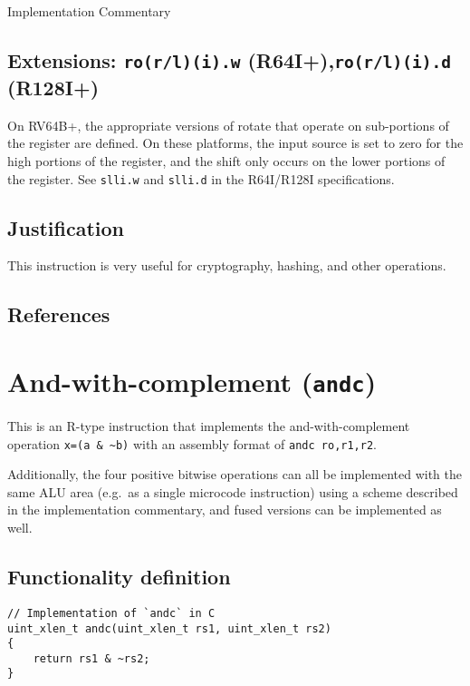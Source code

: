 Implementation Commentary

\subsection{Extensions: \texttt{ro(r/l)(i).w} (R64I+),\texttt{ro(r/l)(i).d} (R128I+)}

On RV64B+, the appropriate versions of rotate that operate on
sub-portions of the register are defined. On these platforms, the input
source is set to zero for the high portions of the register, and the
shift only occurs on the lower portions of the register. See
\texttt{slli.w} and \texttt{slli.d} in the R64I/R128I specifications.

\subsection{Justification}

This instruction is very useful for cryptography, hashing, and other
operations.

\subsection{References}


\section{And-with-complement (\texttt{andc})}



This is an R-type instruction that implements the and-with-complement
operation \texttt{x=(a\ \&\ \textasciitilde{}b)} with an assembly format
of \texttt{andc\ ro,r1,r2}.

Additionally, the four positive bitwise operations can all be
implemented with the same ALU area (e.g.~as a single microcode
instruction) using a scheme described in the implementation commentary,
and fused versions can be implemented as well.

\subsection{Functionality definition}

\begin{verbatim}
// Implementation of `andc` in C
uint_xlen_t andc(uint_xlen_t rs1, uint_xlen_t rs2)
{
    return rs1 & ~rs2;
}
\end{verbatim}

